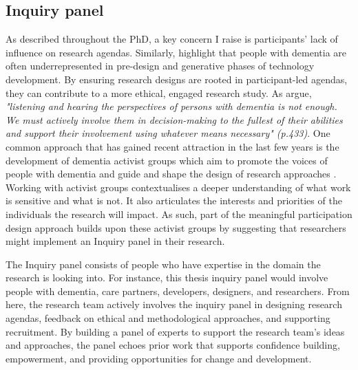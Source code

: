 \subsection{Inquiry panel}
\label{Inquiry Panel}
As described throughout the PhD, a key concern I raise is participants' lack of influence on research agendas. Similarly, \cite{suijkerbuijk_active_2019} highlight that people with dementia are often underrepresented in pre-design and generative phases of technology development. By ensuring research designs are rooted in participant-led agendas, they can contribute to a more ethical, engaged research study. As \cite{dupuis_moving_2012} argue, \textit{"listening and hearing the perspectives of persons with dementia is not enough. We must actively involve them in decision-making to the fullest of their abilities and support their involvement using whatever means necessary" (p.433)}. One common approach that has gained recent attraction in the last few years is the development of dementia activist groups which aim to promote the voices of people with dementia and guide and shape the design of research approaches \citep{weetch2021involvement}. Working with activist groups contextualises a deeper understanding of what work is sensitive and what is not. It also articulates the interests and priorities of the individuals the research will impact. As such, part of the meaningful participation design approach builds upon these activist groups by suggesting that researchers might implement an Inquiry panel in their research.

The Inquiry panel consists of people who have expertise in the domain the research is looking into. For instance, this thesis inquiry panel would involve people with dementia, care partners, developers, designers, and researchers. From here, the research team actively involves the inquiry panel in designing research agendas, feedback on ethical and methodological approaches, and supporting recruitment. By building a panel of experts to support the research team's ideas and approaches, the panel echoes prior work that supports confidence building, empowerment, and providing opportunities for change and development.

